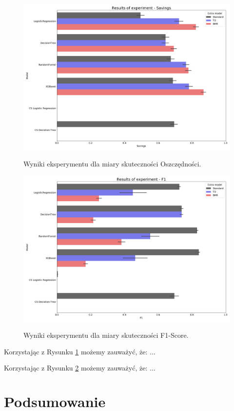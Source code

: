 \documentclass[inzynierska]{pwr_wmat_praca_dyplomowa}
\theoremstyle{plain}
\numberwithin{theorem}{chapter}
\theoremstyle{definition}
\numberwithin{theorem}{chapter}
\begin{document}
\begin{figure}[h]
	\includegraphics[width=\linewidth]{images/100_config1-Savings.png}
	\label{results-savings}
	\caption{Wyniki eksperymentu dla miary skuteczności Oszczędności.}	
\end{figure}

\begin{figure}[h]
	\includegraphics[width=\linewidth]{images/100_config1-F1.png}
	\label{results-f1}
	\caption{Wyniki eksperymentu dla miary skuteczności F1-Score.}
\end{figure}

Korzystając z Rysunku \ref{results-savings} możemy zauważyć, że: ...

Korzystając z Rysunku \ref{results-f1} możemy zauważyć, że: ...	


\chapter*{Podsumowanie}


\nocite{*}

\end{document}

